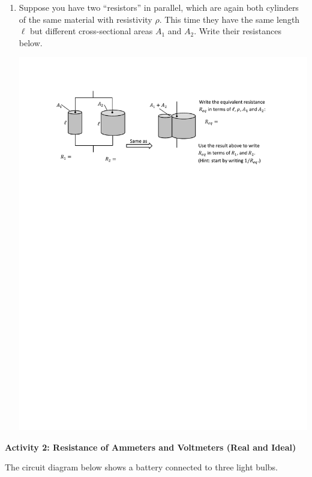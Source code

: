 \begin{enumerate}[labparts]
\item Suppose you have two ``resistors'' in parallel, which are again both cylinders of the same material with resistivity $\rho$.  This time they have the same length $\ell$ but different cross-sectional areas $A_1$ and $A_2$.  Write their resistances below. 
\begin{center}
\includegraphics[scale=0.95]{resistance_ideal_meters/parallel_resistors.pdf}
\end{center}

\end{enumerate}
 
\textbf{Activity 2: Resistance of Ammeters and Voltmeters (Real and Ideal)}
 
 The circuit diagram below shows a battery connected to three light bulbs.

\bigskip


